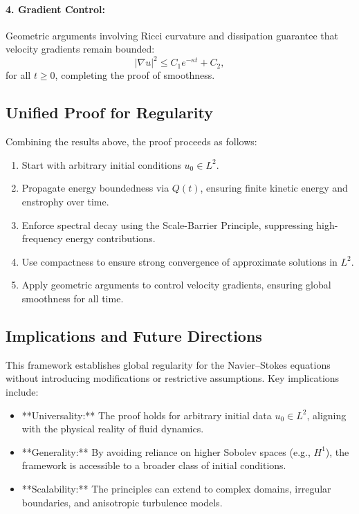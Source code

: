 \documentclass[12pt]{article}
\theoremstyle{definition}
\begin{document}
\paragraph{4. Gradient Control:} Geometric arguments involving Ricci curvature and dissipation guarantee that velocity gradients remain bounded:
\begin{equation}
|\nabla u|^2 \leq C_1 e^{-\kappa t} + C_2,
\end{equation}
for all $t \geq 0$, completing the proof of smoothness.

\subsection{Unified Proof for Regularity}
Combining the results above, the proof proceeds as follows:
\begin{enumerate}
    \item Start with arbitrary initial conditions $u_0 \in L^2$.
    \item Propagate energy boundedness via $Q(t)$, ensuring finite kinetic energy and enstrophy over time.
    \item Enforce spectral decay using the Scale-Barrier Principle, suppressing high-frequency energy contributions.
    \item Use compactness to ensure strong convergence of approximate solutions in $L^2$.
    \item Apply geometric arguments to control velocity gradients, ensuring global smoothness for all time.
\end{enumerate}

\subsection{Implications and Future Directions}

This framework establishes global regularity for the Navier--Stokes equations without introducing modifications or restrictive assumptions. Key implications include:
\begin{itemize}
    \item **Universality:** The proof holds for arbitrary initial data $u_0 \in L^2$, aligning with the physical reality of fluid dynamics.
    \item **Generality:** By avoiding reliance on higher Sobolev spaces (e.g., $H^1$), the framework is accessible to a broader class of initial conditions.
    \item **Scalability:** The principles can extend to complex domains, irregular boundaries, and anisotropic turbulence models.
\end{itemize}
\end{document}
